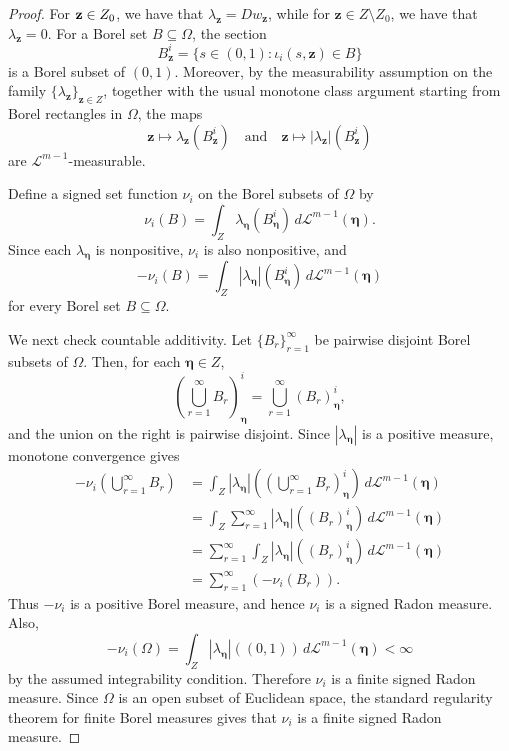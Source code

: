\documentclass[10pt,a4paper]{amsart}
\begin{document}
\begin{proof}
  For $ \text{{\bf z}} \in Z_0$, we have
  that \(\lambda_{\mathbf z}=Dw_{\mathbf z}\), while for
\(\mathbf z\in Z\setminus Z_0\), we have that \(\lambda_{\mathbf z}=0\).
 For a Borel set
$B \subseteq\Omega$, the section
\[
B_{\mathbf z}^{i}
=
\{s\in(0,1):\iota_i(s,\mathbf z)\in B\}
\]
is a Borel subset of \((0,1)\). Moreover, by the measurability assumption on
the family \(\{\lambda_{\mathbf z}\}_{\mathbf z\in Z}\), together with the
usual monotone class argument starting from Borel rectangles in \(\Omega\), the
maps
\[
\mathbf z\mapsto \lambda_{\mathbf z}(B_{\mathbf z}^{i})
\quad\text{and}\quad
\mathbf z\mapsto |\lambda_{\mathbf z}|(B_{\mathbf z}^{i})
\]
are \(\mathcal L^{m-1}\)-measurable.

Define a signed set function \(\nu_i\) on the Borel subsets of \(\Omega\) by
\[
\nu_i(B)
=
\int_Z
\lambda_{\boldsymbol\eta}(B_{\boldsymbol\eta}^{i})
\,d\mathcal L^{m-1}(\boldsymbol\eta).
\]
Since each \(\lambda_{\boldsymbol\eta}\) is nonpositive, \(\nu_i\) is also
nonpositive, and
\[
-\nu_i(B)
=
\int_Z
|\lambda_{\boldsymbol\eta}|(B_{\boldsymbol\eta}^{i})
\,d\mathcal L^{m-1}(\boldsymbol\eta)
\]
for every Borel set \(B\subseteq\Omega\).

We next check countable additivity. Let \(\{B_r\}_{r=1}^{\infty}\) be pairwise
disjoint Borel subsets of \(\Omega\). Then, for each
\(\boldsymbol\eta\in Z\),
\[
\left(\bigcup_{r=1}^{\infty}B_r\right)_{\boldsymbol\eta}^{i}
=
\bigcup_{r=1}^{\infty}(B_r)_{\boldsymbol\eta}^{i},
\]
and the union on the right is pairwise disjoint. Since
\(|\lambda_{\boldsymbol\eta}|\) is a positive measure, monotone convergence
gives
\[
\begin{aligned}
-\nu_i\left(\bigcup_{r=1}^{\infty}B_r\right)
&=
\int_Z
|\lambda_{\boldsymbol\eta}|
\left(
\left(\bigcup_{r=1}^{\infty}B_r\right)_{\boldsymbol\eta}^{i}
\right)
\,d\mathcal L^{m-1}(\boldsymbol\eta) \\[4pt]
&=
\int_Z
\sum_{r=1}^{\infty}
|\lambda_{\boldsymbol\eta}|((B_r)_{\boldsymbol\eta}^{i})
\,d\mathcal L^{m-1}(\boldsymbol\eta) \\[4pt]
&=
\sum_{r=1}^{\infty}
\int_Z
|\lambda_{\boldsymbol\eta}|((B_r)_{\boldsymbol\eta}^{i})
\,d\mathcal L^{m-1}(\boldsymbol\eta) \\[4pt]
&=
\sum_{r=1}^{\infty}(-\nu_i(B_r)).
\end{aligned}
\]
Thus \(-\nu_i\) is a positive Borel measure, and hence \(\nu_i\) is a signed
 Radon measure. Also,
\[
-\nu_i(\Omega)
=
\int_Z
|\lambda_{\boldsymbol\eta}|((0,1))
\,d\mathcal L^{m-1}(\boldsymbol\eta)
<\infty
\]
by the assumed integrability condition. Therefore \(\nu_i\) is a finite signed
 Radon measure. Since \(\Omega\) is an open subset of Euclidean space, the
standard regularity theorem for finite Borel measures gives that \(\nu_i\) is a
finite signed Radon measure.


\end{proof}
\end{document}
